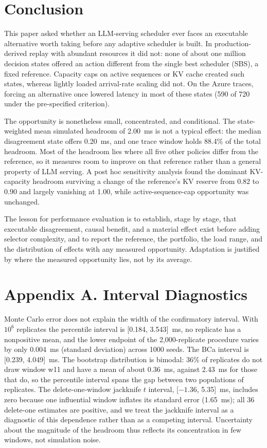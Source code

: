 \documentclass[preprint,12pt]{elsarticle}
\begin{document}
\section{Conclusion}
\label{sec:conclusion}

This paper asked whether an LLM-serving scheduler ever faces an executable alternative worth taking before any adaptive scheduler is built. In production-derived replay with abundant resources it did not: none of about one million decision states offered an action different from the single best scheduler (SBS), a fixed reference. Capacity caps on active sequences or KV cache created such states, whereas lightly loaded arrival-rate scaling did not. On the Azure traces, forcing an alternative once lowered latency in most of these states (590 of 720 under the pre-specified criterion).

The opportunity is nonetheless small, concentrated, and conditional. The state-weighted mean simulated headroom of 2.00~ms is not a typical effect: the median disagreement state offers 0.20~ms, and one trace window holds 88.4\% of the total headroom. Most of the headroom lies where all five other policies differ from the reference, so it measures room to improve on that reference rather than a general property of LLM serving. A post hoc sensitivity analysis found the dominant KV-capacity headroom surviving a change of the reference's KV reserve from 0.82 to 0.90 and largely vanishing at 1.00, while active-sequence-cap opportunity was unchanged.

The lesson for performance evaluation is to establish, stage by stage, that executable disagreement, causal benefit, and a material effect exist before adding selector complexity, and to report the reference, the portfolio, the load range, and the distribution of effects with any measured opportunity. Adaptation is justified by where the measured opportunity lies, not by its average.

\section*{Appendix A. Interval Diagnostics}
Monte Carlo error does not explain the width of the confirmatory interval.
With $10^6$ replicates the percentile interval is [0.184, 3.543]~ms, no
replicate has a nonpositive mean, and the lower endpoint of the 2,000-replicate
procedure varies by only 0.004~ms (standard deviation) across 1000 seeds. The BCa
interval is [0.239, 4.049]~ms. The bootstrap distribution is bimodal: 36\% of
replicates do not draw window w11 and have a mean of about 0.36~ms, against
2.43~ms for those that do, so the percentile interval spans the gap between
two populations of replicates. The delete-one-window jackknife $t$ interval,
[$-1.36$, 5.35]~ms, includes zero because one influential window inflates its
standard error (1.65~ms); all 36 delete-one estimates are positive, and we
treat the jackknife interval as a diagnostic of this dependence rather than as
a competing interval. Uncertainty about the magnitude of the headroom thus
reflects its concentration in few windows, not simulation noise.
\end{document}
